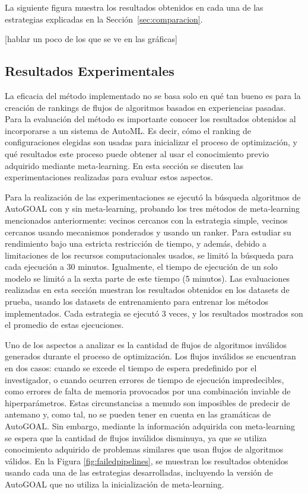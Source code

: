 La siguiente figura muestra los resultados obtenidos en cada una de las estrategias explicadas en la Sección~\ref{sec:comparacion}.

[hablar un poco de los que se ve en las gráficas]

\subsection{Resultados Experimentales}\label{subsec:resultados}

%
%

La eficacia del método implementado no se basa solo en qué tan bueno es para la creación de rankings  de flujos de algoritmos basados en experiencias pasadas. Para la evaluación del método es importante conocer los resultados obtenidos al incorporarse a un sistema de AutoML. Es decir, cómo el ranking de configuraciones elegidas son usadas para inicializar el proceso de optimización, y qué resultados este proceso puede obtener al usar el conocimiento previo adquirido mediante meta-learning. En esta sección se discuten las experimentaciones realizadas para evaluar estos aspectos.

Para la realización de las experimentaciones se ejecutó la búsqueda algoritmos de AutoGOAL con y sin meta-learning, probando los tres métodos de meta-learning mencionados anteriormente: vecinos cercanos con la estrategia simple, vecinos cercanos usando mecanismos ponderados y usando un ranker. Para estudiar su rendimiento bajo una estricta restricción de tiempo, y además, debido a limitaciones de los recursos computacionales usados, se limitó la búsqueda para cada ejecución a 30 minutos. Igualmente, el tiempo de ejecución de un solo modelo se limitó a la sexta parte de este tiempo (5 minutos). Las evaluaciones realizadas en esta sección muestran los resultados obtenidos en los datasets de prueba, usando los datasets de entrenamiento para entrenar los métodos implementados. Cada estrategia se ejecutó 3 veces, y los resultados mostrados son el promedio de estas ejecuciones. 

Uno de los aspectos a analizar es la cantidad de flujos de algoritmos inválidos generados durante el proceso de optimización. Los flujos inválidos se encuentran en dos casos: cuando se excede el tiempo de espera predefinido por el investigador, o cuando ocurren errores de tiempo de ejecución impredecibles, como errores de falta de memoria provocados por una combinación inviable de hiperparámetros. Estas circunstancias a menudo son imposibles de predecir de antemano y, como tal, no se pueden tener en cuenta en las gramáticas de AutoGOAL. Sin embargo, mediante la información adquirida con meta-learning se espera que la cantidad de flujos inválidos disminuya, ya que se utiliza conocimiento adquirido de problemas similares que usan flujos de algoritmos válidos. En la Figura \ref{fig:failedpipelines}, se muestran los resultados obtenidos usando cada una de las estrategias desarrolladas, incluyendo la versión de AutoGOAL que no utiliza la inicialización de meta-learning.

